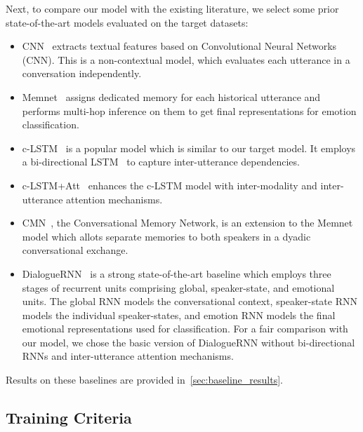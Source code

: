 \documentclass[preprint,3pt]{elsarticle}
\begin{document}
Next, to compare our model with the existing literature, we select some prior state-of-the-art models evaluated on the target datasets:

\begin{itemize}[leftmargin=*]
    \item CNN~\cite{DBLP:conf/emnlp/Kim14} extracts textual features based on Convolutional Neural Networks (CNN). This is a non-contextual model, which evaluates each utterance in a conversation independently.
    
    \item Memnet~\cite{DBLP:conf/nips/SukhbaatarSWF15} assigns dedicated memory for each historical utterance and performs multi-hop inference on them to get final representations for emotion classification.
    
    \item c-LSTM~\cite{poria2017context} is a popular model which is similar to our target model. It employs a bi-directional LSTM~\cite{DBLP:journals/neco/HochreiterS97} to capture inter-utterance dependencies.
    
    \item c-LSTM+Att~\cite{DBLP:conf/icdm/PoriaCHMZM17} enhances the c-LSTM model with inter-modality and inter-utterance attention mechanisms.
    
    \item CMN~\cite{DBLP:conf/naacl/HazarikaPZCMZ18}, the Conversational Memory Network, is an extension to the Memnet model which allots separate memories to both speakers in a dyadic conversational exchange.
    
    \item DialogueRNN~\cite{DBLP:conf/aaai/MajumderPHMGC19} is a strong state-of-the-art baseline which employs three stages of recurrent units comprising global, speaker-state, and emotional units. The global RNN models the conversational context, speaker-state RNN models the individual speaker-states, and emotion RNN models the final emotional representations used for classification. For a fair comparison with our model, we chose the basic version of DialogueRNN without bi-directional RNNs and inter-utterance attention mechanisms.
\end{itemize}

\noindent Results on these baselines are provided in~\cref{sec:baseline_results}.


\subsection{Training Criteria}
\end{document}
